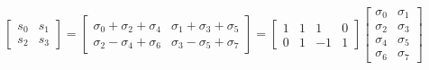 \documentclass{article}%
\begin{document}
\[%
\left[\begin{matrix}s_{0} & s_{1}\\s_{2} & s_{3}\end{matrix}\right] = \left[\begin{matrix}\sigma_{0} + \sigma_{2} + \sigma_{4} & \sigma_{1} + \sigma_{3} + \sigma_{5}\\\sigma_{2} - \sigma_{4} + \sigma_{6} & \sigma_{3} - \sigma_{5} + \sigma_{7}\end{matrix}\right] = \left[\begin{matrix}1 & 1 & 1 & 0\\0 & 1 & -1 & 1\end{matrix}\right] \left[\begin{matrix}\sigma_{0} & \sigma_{1}\\\sigma_{2} & \sigma_{3}\\\sigma_{4} & \sigma_{5}\\\sigma_{6} & \sigma_{7}\end{matrix}\right]%
\]%
\end{document}
